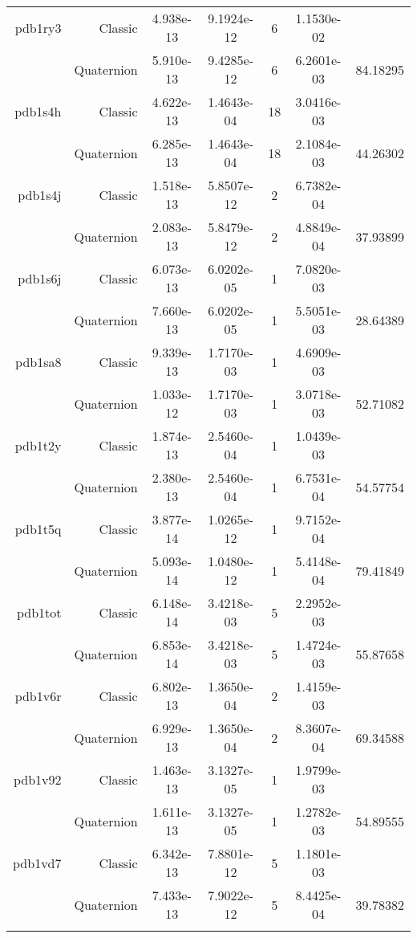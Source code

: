\begin{xltabular}{\textwidth}{r|rS[table-format=1.3e+2]S[table-format=1.4e+2]cS[table-format=1.4e+2]S[table-format=-1.5]}
pdb1ry3 & Classic & 4.938e-13 & 9.1924e-12 & 6 & 1.1530e-02 & \\
& Quaternion & 5.910e-13 & 9.4285e-12 & 6 & 6.2601e-03 & 84.18295\\  \addlinespace
pdb1s4h & Classic & 4.622e-13 & 1.4643e-04 & 18 & 3.0416e-03 & \\
& Quaternion & 6.285e-13 & 1.4643e-04 & 18 & 2.1084e-03 & 44.26302\\  \addlinespace
pdb1s4j & Classic & 1.518e-13 & 5.8507e-12 & 2 & 6.7382e-04 & \\
& Quaternion & 2.083e-13 & 5.8479e-12 & 2 & 4.8849e-04 & 37.93899\\  \addlinespace
pdb1s6j & Classic & 6.073e-13 & 6.0202e-05 & 1 & 7.0820e-03 & \\
& Quaternion & 7.660e-13 & 6.0202e-05 & 1 & 5.5051e-03 & 28.64389\\  \addlinespace
pdb1sa8 & Classic & 9.339e-13 & 1.7170e-03 & 1 & 4.6909e-03 & \\
& Quaternion & 1.033e-12 & 1.7170e-03 & 1 & 3.0718e-03 & 52.71082\\  \addlinespace
pdb1t2y & Classic & 1.874e-13 & 2.5460e-04 & 1 & 1.0439e-03 & \\
& Quaternion & 2.380e-13 & 2.5460e-04 & 1 & 6.7531e-04 & 54.57754\\  \addlinespace
pdb1t5q & Classic & 3.877e-14 & 1.0265e-12 & 1 & 9.7152e-04 & \\
& Quaternion & 5.093e-14 & 1.0480e-12 & 1 & 5.4148e-04 & 79.41849\\  \addlinespace
pdb1tot & Classic & 6.148e-14 & 3.4218e-03 & 5 & 2.2952e-03 & \\
& Quaternion & 6.853e-14 & 3.4218e-03 & 5 & 1.4724e-03 & 55.87658\\  \addlinespace
pdb1v6r & Classic & 6.802e-13 & 1.3650e-04 & 2 & 1.4159e-03 & \\
& Quaternion & 6.929e-13 & 1.3650e-04 & 2 & 8.3607e-04 & 69.34588\\  \addlinespace
pdb1v92 & Classic & 1.463e-13 & 3.1327e-05 & 1 & 1.9799e-03 & \\
& Quaternion & 1.611e-13 & 3.1327e-05 & 1 & 1.2782e-03 & 54.89555\\  \addlinespace
pdb1vd7 & Classic & 6.342e-13 & 7.8801e-12 & 5 & 1.1801e-03 & \\
& Quaternion & 7.433e-13 & 7.9022e-12 & 5 & 8.4425e-04 & 39.78382\\  \addlinespace

\end{xltabular}
